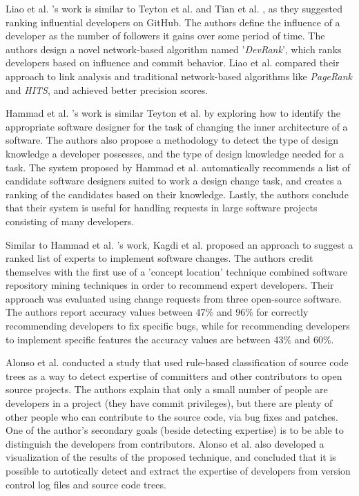         Liao et al. \cite{liao2017devrank}'s work is similar to Teyton et al. \cite{teyton2013find} and Tian et al. \cite{tian2019geek}, as they suggested ranking influential developers on GitHub. The authors define the influence of a developer as the number of followers it gains over some period of time. The authors design a novel network-based algorithm named '\emph{DevRank}', which ranks developers based on influence and commit behavior. Liao et al. compared their approach to link analysis and traditional network-based algorithms like \emph{PageRank} and \emph{HITS}, and achieved better precision scores.
        
        Hammad et al. \cite{hammad2013identifying}'s work is similar Teyton et al. \cite{teyton2013find} by exploring how to identify the appropriate software designer for the task of changing the inner architecture of a software. The authors also propose a methodology to detect the type of design knowledge a developer possesses, and the type of design knowledge needed for a task. The system proposed by Hammad et al. automatically recommends a list of candidate software designers suited to work a design change task, and creates a ranking of the candidates based on their knowledge. Lastly, the authors conclude that their system is useful for handling requests in large software projects consisting of many developers.
        
        Similar to Hammad et al. \cite{hammad2013identifying}'s work, Kagdi et al. \cite{kagdi2012assigning} proposed an approach to suggest a ranked list of experts to implement software changes. The authors credit themselves with the first use of a 'concept location' technique combined software repository mining techniques in order to recommend expert developers. Their approach was evaluated using change requests from three open-source software. The authors report accuracy values between 47\% and 96\% for correctly recommending developers to fix specific bugs, while for recommending developers to implement specific features the accuracy values are between 43\% and 60\%.
        
        Alonso et al. \cite{alonso2008expertise} conducted a study that used rule-based classification of source code trees as a way to detect expertise of committers and other contributors to open source projects. The authors explain that only a small number of people are developers in a project (they have commit privileges), but there are plenty of other people who can contribute to the source code, via bug fixes and patches. One of the author's secondary goals (beside detecting expertise) is to be able to distinguish the developers from contributors. Alonso et al. also developed a visualization of the results of the proposed technique, and concluded that it is possible to autotically detect and extract the expertise of developers from version control log files and source code trees.
        
